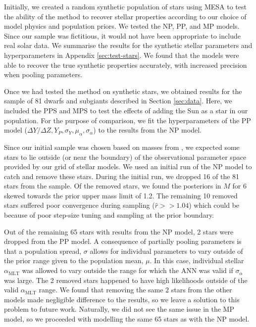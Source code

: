 \documentclass[a4paper,fleqn,usenatbib]{mnras}
\newcommand{\mlt}{\ensuremath{{\alpha_\mathrm{MLT}}}}
\begin{document}
Initially, we created a random synthetic population of stars using \textsc{MESA} to test the ability of the method to recover stellar properties according to our choice of model physics and population priors. We tested the NP, PP, and MP models. Since our sample was fictitious, it would not have been appropriate to include real solar data. We summarise the results for the synthetic stellar parameters and hyperparameters in Appendix \ref{sec:test-stars}. We found that the models were able to recover the true synthetic properties accurately, with increased precision when pooling parameters.

Once we had tested the method on synthetic stars, we obtained results for the sample of 81 dwarfs and subgiants described in Section \ref{sec:data}. Here, we included the PPS and MPS to test the effects of adding the Sun as a star in our population. For the purpose of comparison, we fit the hyperparameters of the PP model ($\Delta Y/\Delta Z, Y_P, \sigma_Y, \mu_\alpha, \sigma_\alpha$) to the results from the NP model.

Since our initial sample was chosen based on masses from , we expected some stars to lie outside (or near the boundary) of the observational parameter space provided by our grid of stellar models. We used an initial run of the NP model to catch and remove these stars. During the initial run, we dropped 16 of the 81 stars from the sample. Of the removed stars, we found the posteriors in $M$ for 6 skewed towards the prior upper mass limit of \SI{1.2}{\solarmass}. The remaining 10 removed stars suffered poor convergence during sampling ($\hat{r} >> 1.04$) which could be because of poor step-size tuning and sampling at the prior boundary.

Out of the remaining 65 stars with results from the NP model, 2 stars were dropped from the PP model. A consequence of partially pooling parameters is that a population spread, $\sigma$ allows for individual parameters to vary outside of the prior range given to the population mean, $\mu$. In this case, individual stellar $\mlt$ was allowed to vary outside the range for which the ANN was valid if $\sigma_\alpha$ was large. The 2 removed stars happened to have high likelihoods outside of the valid $\mlt$ range. We found that removing the same 2 stars from the other models made negligible difference to the results, so we leave a solution to this problem to future work. Naturally, we did not see the same issue in the MP model, so we proceeded with modelling the same 65 stars as with the NP model.
\end{document}
